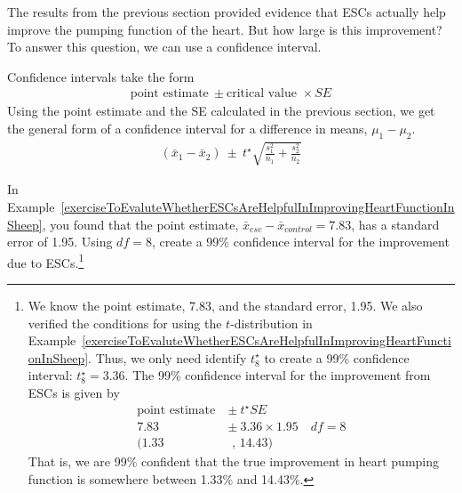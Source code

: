 The results from the previous section provided evidence that ESCs actually help improve the pumping function of the heart. But how large is this improvement? To answer this question, we can use a confidence interval.

Confidence intervals take the form
\begin{align*}
\text{point estimate} \ \pm \text{critical value }\times SE
\end{align*}
Using the point estimate and the SE calculated in the previous section, we get the general form of a confidence interval for a difference in means, $\mu_1-\mu_2$.
\begin{align*}
(\bar{x}_1-\bar{x}_2) \ \pm \ t^\star\sqrt{\frac{s_1^2}{n_1} + \frac{s_2^2}{n_2}}
\end{align*}

\begin{exercise}
In Example~\ref{exerciseToEvaluteWhetherESCsAreHelpfulInImprovingHeartFunctionInSheep}, you found that the point estimate, $\bar{x}_{esc} - \bar{x}_{control} = 7.83$, has a standard error of 1.95. Using $df=8$, create a 99\% confidence interval for the improvement due to ESCs.\footnote{We know the point estimate, 7.83, and the standard error, 1.95. We also verified the conditions for using the $t$-distribution in Example~\ref{exerciseToEvaluteWhetherESCsAreHelpfulInImprovingHeartFunctionInSheep}. Thus, we only need identify $t^{\star}_8$ to create a 99\% confidence interval: $t^{\star}_{8} = 3.36$. The 99\% confidence interval for the improvement from ESCs is given by
\begin{align*}
\text{point estimate}\ &\pm\ t^{\star}SE \\
7.83\ &\pm\ 3.36\times 1.95 \quad  df=8\\
(1.33 &\text{ , } 14.43)
\end{align*}
That is, we are 99\% confident that the true improvement in heart pumping function is somewhere between 1.33\% and 14.43\%.}


\end{exercise}


